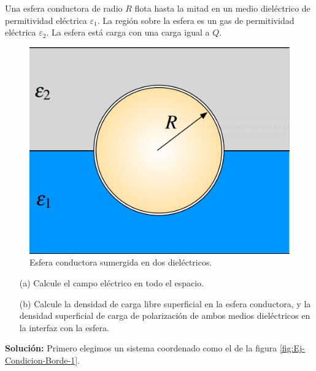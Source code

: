 \begin{ejemplo} \label{Ej-Cond-Borde}
Una esfera conductora de radio $R$ flota hasta la mitad en un medio dieléctrico de permitividad eléctrica $\varepsilon_1$. La región sobre la esfera es un gas de permitividad eléctrica $\varepsilon_2$. La esfera está carga con una carga igual a $Q$.

\begin{figure}[H]
    \centering
    \includegraphics[scale = 0.45]{Figuras/Ej-Condicion-Borde.png}
    \caption{Esfera conductora sumergida en dos dieléctricos.}
    \label{fig:Ej-Condicion-Borde}
\end{figure}

\begin{itemize}
    \item[(a)] Calcule el campo eléctrico en todo el espacio. 

    \item[(b)] Calcule la densidad de carga libre superficial en la esfera conductora, y la densidad superficial de carga de polarización de ambos medios dieléctricos en la interfaz con la esfera.
\end{itemize}

\textbf{Solución:} Primero elegimos un sistema coordenado como el de la figura \ref{fig:Ej-Condicion-Borde-1}.


\end{ejemplo}
